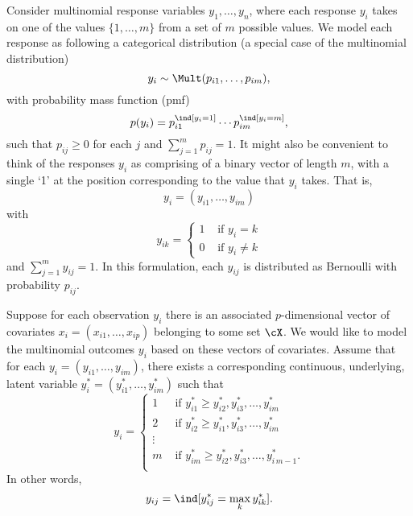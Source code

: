 \documentclass[]{article}
\begin{document}
Consider multinomial response variables $y_1, \dots, y_n$, where each response $y_i$ takes on one of the values $\{1,\dots,m\}$ from a set of $m$ possible values. We model each response as following a categorical distribution (a special case of the multinomial distribution)
\[
  y_i \sim \Mult(p_{i1}, \dots, p_{im}),
\]
with probability mass function (pmf)
\[
  p(y_i) = p_{i1}^{\ind[y_i = 1]} \cdots p_{im}^{\ind[y_i = m]},
\]
such that $p_{ij} \geq 0 $ for each $j$ and $\sum_{j=1}^m p_{ij} = 1$. It might also be convenient to think of the responses $y_i$ as comprising of a binary vector of length $m$, with a single `1' at the position corresponding to the value that $y_i$ takes. That is,
\[
  y_i = (y_{i1}, \dots, y_{im})
\]
with
\[
  y_{ik} =
  \begin{cases}
    1 &\text{ if } y_i = k \\
    0 &\text{ if } y_i \neq k
  \end{cases}
\]
and $\sum_{j=1}^m y_{ij} = 1$. In this formulation, each $y_{ij}$ is distributed as Bernoulli with probability $p_{ij}$.

Suppose for each observation $y_i$ there is an associated $p$-dimensional vector of covariates $x_i = (x_{i1}, \dots, x_{ip})$ belonging to some set $\cX$. We would like to model the multinomial outcomes $y_i$ based on these vectors of covariates. Assume that for each $y_i = (y_{i1}, \dots, y_{im})$, there exists a corresponding continuous, underlying, latent variable $y_i^* = (y_{i1}^*, \dots, y_{im}^*)$ such that
\[
  y_i =
  \begin{cases}
    1 &\text{ if } y_{i1}^* \geq y_{i2}^*, y_{i3}^*, \dots, y_{im}^* \\
    2 &\text{ if } y_{i2}^* \geq y_{i1}^*, y_{i3}^*, \dots, y_{im}^* \\
    \vdots \\
    m &\text{ if } y_{im}^* \geq y_{i2}^*, y_{i3}^*, \dots, y_{i\,m-1}^*. \\
  \end{cases}
\]
In other words, 
\[
  y_{ij} = \ind[y_{ij}^* = \max_k y_{ik}^*].
\]
\end{document}
